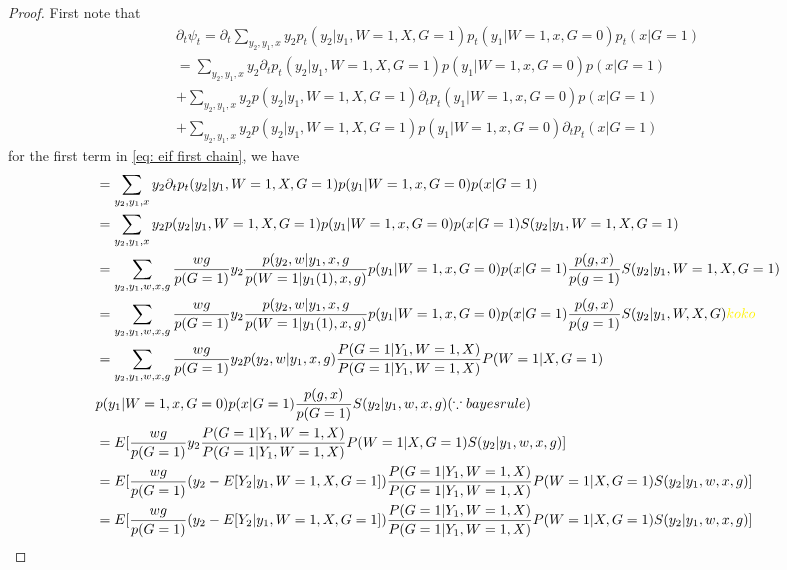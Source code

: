 \documentclass{article}
\begin{document}
\begin{proof}
    First note that 
    \begin{align}
        \partial_t \psi_t = \partial_t \sum_ { y_2, y_1,x} y_2 p_t ( y_2| y_1 , W= 1, X , G= 1) p_t ( y_1 | W =1 , x, G= 0 ) p_t( x | G =1 )   \\
        = \label{eq: eif first chain} \sum_ { y_2 ,y_1,x} y_2 \partial_t p_t ( y_2| y_1 , W= 1, X , G= 1) p ( y_1 | W =1 , x, G= 0 ) p( x | G =1 )   \\
        + \sum_ { y_2 ,y_1,x} y_2  p ( y_2| y_1 , W= 1, X , G= 1)\partial_t p_t ( y_1 | W =1 , x, G= 0 ) p( x | G =1 ) \\
    + \sum_ { y_2 ,y_1,x} y_2  p ( y_2| y_1 , W= 1, X , G= 1) p ( y_1 | W =1 , x, G= 0 ) \partial_t p_t( x | G =1 )
    \end{align}
    for the first term in  \ref{eq: eif first chain},  we have
\begin{align}
&=\sum_ { y_2 ,y_1,x} y_2 \partial_t p_t ( y_2| y_1 , W= 1, X , G= 1) p ( y_1 | W =1 , x, G= 0 ) p( x | G =1 ) \\
&= \sum_ { y_2 ,y_1,x} y_2 p ( y_2| y_1 , W= 1, X , G= 1) p ( y_1 | W =1 , x, G= 0 ) p( x | G =1 ) S ( y_2| y_1 , W= 1, X , G= 1) \\
&= \sum_ { y_2 ,y_1,w, x, g}  \frac{ w g }{ p (G = 1) } y_2  \frac{ p( y_2, w | y_1, x, g}{ p ( W = 1 | y_1(1) , x , g ) }   p ( y_1 | W =1 , x, G= 0 ) p( x | G =1 ) \frac{ p ( g, x ) } { p(g =1)} S ( y_2| y_1 , W= 1, X , G= 1) \\
&= \sum_ { y_2 ,y_1,w, x, g}  \frac{ w g }{ p (G = 1) } y_2  \frac{ p( y_2, w | y_1, x, g}{ p ( W = 1 | y_1(1) , x , g ) }   p ( y_1 | W =1 , x, G= 0 ) p( x | G =1 ) \frac{ p ( g, x ) } { p(g =1)} S ( y_2| y_1 , W, X , G) \koko \\
&= \sum_ { y_2 ,y_1,w, x, g}  \frac{ w g }{ p (G = 1) } y_2   p( y_2, w | y_1, x, g)  \frac{ P( G =1 | Y_1 , W=1 , X ) }{ P(G=1 | Y_1 , W=1 , X ) } P( W=1 | X , G=1)   \\
&p ( y_1 | W =1 , x, G= 0 ) p( x | G =1 )  
\frac{ p ( g, x ) } { p(G =1)} S ( y_2| y_1 , w, x , g) ( \because bayes rule)\\
&= E [  \frac{ w g }{ p (G = 1) } y_2     \frac{ P( G =1 | Y_1 , W=1 , X ) }{ P(G=1 | Y_1 , W=1 , X ) } P( W=1 | X , G=1)   S ( y_2| y_1 , w, x , g) ]\\
&= E [  \frac{ w g }{ p (G = 1) } ( y_2 - E [ Y_2 | y_1 , W = 1, X, G =1 ] )     \frac{ P( G =1 | Y_1 , W=1 , X ) }{ P(G=1 | Y_1 , W=1 , X ) } P( W=1 | X , G=1)   S ( y_2| y_1 , w, x , g) ]\\
&= E [  \frac{ w g }{ p (G = 1) } ( y_2 - E [ Y_2 | y_1 , W = 1, X, G =1 ] )     \frac{ P( G =1 | Y_1 , W=1 , X ) }{ P(G=1 | Y_1 , W=1 , X ) } P( W=1 | X , G=1)   S ( y_2| y_1 , w, x , g) ]\\

\end{align}
\end{proof}
\end{document}
